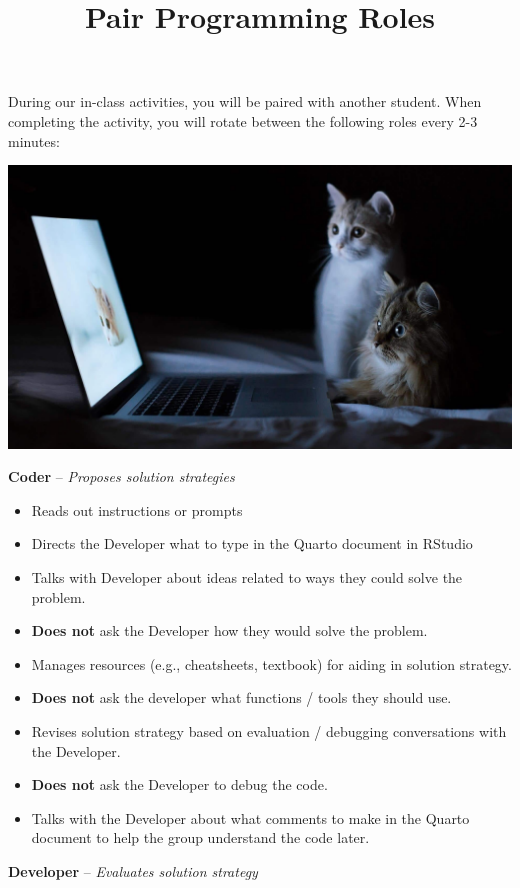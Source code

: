 \documentclass[
  letterpaper,
  DIV=11,
  numbers=noendperiod]{scrartcl}
\title{Pair Programming Roles}
\author{}
\date{}
\providecommand{\tightlist}{%
  \setlength{\itemsep}{0pt}\setlength{\parskip}{0pt}}\usepackage{longtable,booktabs,array}
\begin{document}
\maketitle


During our in-class activities, you will be paired with another student.
When completing the activity, you will rotate between the following
roles every 2-3 minutes:

\includegraphics{cats-programming.jpg}

\textbf{Coder} -- \emph{Proposes solution strategies}

\begin{itemize}
\tightlist
\item
  Reads out instructions or prompts
\item
  Directs the Developer what to type in the Quarto document in RStudio
\item
  Talks with Developer about ideas related to ways they could solve the
  problem.
\item
  \textbf{Does not} ask the Developer how they would solve the problem.
\item
  Manages resources (e.g., cheatsheets, textbook) for aiding in solution
  strategy.
\item
  \textbf{Does not} ask the developer what functions / tools they should
  use.
\item
  Revises solution strategy based on evaluation / debugging
  conversations with the Developer.
\item
  \textbf{Does not} ask the Developer to debug the code.
\item
  Talks with the Developer about what comments to make in the Quarto
  document to help the group understand the code later.
\end{itemize}

\textbf{Developer} -- \emph{Evaluates solution strategy}
\end{document}

